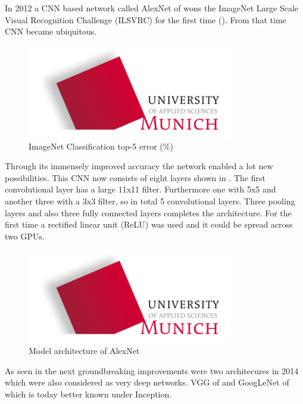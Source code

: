 In 2012 a CNN based network called AlexNet of \citet{Krizhevsky2012} wons the ImageNet Large Scale Visual Recognition Challenge (ILSVRC) for the first time (). From that time CNN became ubiquitous.
\begin{figure}[htbp]
\includegraphics[width=0.8\textwidth]{includes/MUASlogo}
\caption[ImageNet Classification top-5 error]{ImageNet Classification top-5 error (\%) \citep{He2016}}
\label{fig:FH-Logo1}
\end{figure}
Through its immensely improved accuracy the network enabled a lot new possibilities. This CNN now consists of eight layers shown in . The first convolutional layer has a large 11x11 filter. Furthermore one with 5x5 and another three with a 3x3 filter, so in total 5 convolutional layers. Three pooling layers and also three fully connected layers completes the architecture. For the first time a rectified linear unit (ReLU) was used and it could be spread across two GPUs.

\begin{figure}[htbp]
\includegraphics[width=0.8\textwidth]{includes/MUASlogo}
\caption[Model architecture of AlexNet]{Model architecture of AlexNet \citep{He2016}}
\label{fig:FH-Logo2}
\end{figure}

As seen in  the next groundbreaking improvements were two architecures in 2014 which were also considered as very deep networks. VGG of \citet{Simonyan2015} and GoogLeNet of \citet{Szegedy2014} which is today better known under \glq Inception\grq. 

